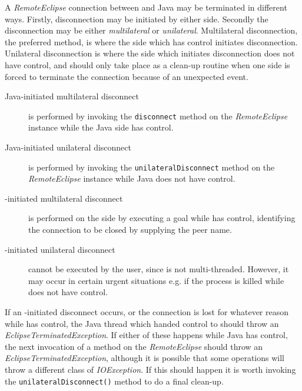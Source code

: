 A {\it RemoteEclipse} connection between {\eclipse} and Java may be
terminated in different ways. Firstly, disconnection may be initiated
by either side. Secondly the disconnection may be either {\it
multilateral} or {\it unilateral}. Multilateral disconnection, the
preferred method, is where the side which has control initiates
disconnection. Unilateral disconnection is where the side which
initiates disconnection does not have control, and should only take
place as a clean-up routine when one side is forced to terminate the
connection because of an unexpected event.


\begin{description}
 \item[Java-initiated multilateral disconnect] is performed by
 invoking the {\tt disconnect} method on the {\it RemoteEclipse}
 instance while the Java side has control.

 \item[Java-initiated unilateral disconnect] is performed by
 invoking the {\tt unilateralDisconnect} method on the {\it
 RemoteEclipse} instance while Java does not have control.

 \item[{\eclipse}-initiated multilateral disconnect] is performed on
 the {\eclipse} side by executing a  goal
 while {\eclipse} has control, identifying the connection to be closed
 by supplying the peer name.

 \item[{\eclipse}-initiated unilateral disconnect] cannot be
 executed by the user, since {\eclipse} is not
 multi-threaded. However, it may occur in certain urgent situations
 e.g. if the {\eclipse} process is killed while {\eclipse} does not
 have control.
\end{description}
If an {\eclipse}-initiated disconnect occurs, or the connection is
lost for whatever reason while {\eclipse} has control, the Java thread
which handed control to {\eclipse} should throw an {\it
EclipseTerminatedException}. If either of these happens while Java has
control, the next invocation of a method on the {\it
RemoteEclipse} should throw an {\it EclipseTerminatedException},
although it is possible that some operations will throw a different
class of {\it IOException}. If this should happen it is worth invoking
the {\tt unilateralDisconnect()} method to do a final clean-up.

